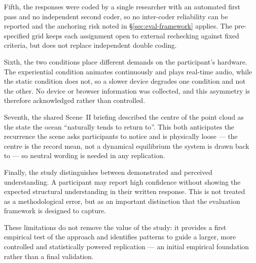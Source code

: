 Fifth, the responses were coded by a single researcher with an automated first pass and no independent second coder, so no inter-coder reliability can be reported and the anchoring risk noted in \S\ref{sec:eval-framework} applies. The pre-specified grid keeps each assignment open to external rechecking against fixed criteria, but does not replace independent double coding.

Sixth, the two conditions place different demands on the participant's hardware. The experiential condition animates continuously and plays real-time audio, while the static condition does not, so a slower device degrades one condition and not the other. No device or browser information was collected, and this asymmetry is therefore acknowledged rather than controlled.

Seventh, the shared Scene~II briefing described the centre of the point cloud as the state the ocean ``naturally tends to return to''. This both anticipates the recurrence the scene asks participants to notice and is physically loose --- the centre is the record mean, not a dynamical equilibrium the system is drawn back to --- so neutral wording is needed in any replication.

Finally, the study distinguishes between demonstrated and perceived understanding. A participant may report high confidence without showing the expected structural understanding in their written response. This is not treated as a methodological error, but as an important distinction that the evaluation framework is designed to capture.

These limitations do not remove the value of the study: it provides a first empirical test of the approach and identifies patterns to guide a larger, more controlled and statistically powered replication --- an initial empirical foundation rather than a final validation.